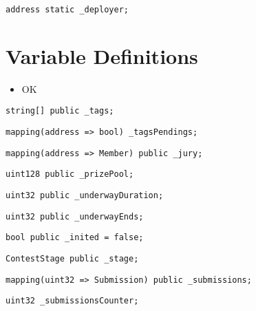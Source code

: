 \begin{lstlisting}[firstnumber=28]
    address static _deployer;
\end{lstlisting}

\section{Variable Definitions}

\begin{itemize}
\item OK
\end{itemize}

\begin{lstlisting}[firstnumber=25]
    string[] public _tags;
\end{lstlisting}

\begin{lstlisting}[firstnumber=26]
    mapping(address => bool) _tagsPendings;
\end{lstlisting}

\begin{lstlisting}[firstnumber=27]
    mapping(address => Member) public _jury;
\end{lstlisting}

\begin{lstlisting}[firstnumber=30]
    uint128 public _prizePool;
\end{lstlisting}

\begin{lstlisting}[firstnumber=31]
    uint32 public _underwayDuration;
\end{lstlisting}

\begin{lstlisting}[firstnumber=32]
    uint32 public _underwayEnds;
\end{lstlisting}

\begin{lstlisting}[firstnumber=45]
    bool public _inited = false;
\end{lstlisting}

\begin{lstlisting}[firstnumber=104]
    ContestStage public _stage;
\end{lstlisting}

\begin{lstlisting}[firstnumber=118]
    mapping(uint32 => Submission) public _submissions;
\end{lstlisting}

\begin{lstlisting}[firstnumber=119]
    uint32 _submissionsCounter;
\end{lstlisting}

